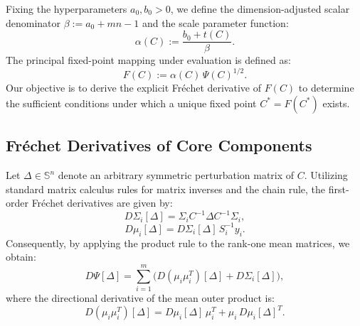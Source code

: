 \documentclass[11pt]{article}
\begin{document}
Fixing the hyperparameters $a_0, b_0 > 0$, we define the dimension-adjusted scalar denominator $\beta := a_0 + mn - 1$ and the scale parameter function:
\begin{equation}
\alpha(C) := \frac{b_0 + t(C)}{\beta}.
\end{equation}
The principal fixed-point mapping under evaluation is defined as:
\begin{equation}\label{eq:F-def}
F(C) := \alpha(C)\,\Psi(C)^{1/2}.
\end{equation}
Our objective is to derive the explicit Fr\'echet derivative of $F(C)$ to determine the sufficient conditions under which a unique fixed point $C^* = F(C^*)$ exists.

\subsection{Fr\'echet Derivatives of Core Components}
Let $\Delta \in \mathbb{S}^n$ denote an arbitrary symmetric perturbation matrix of $C$. Utilizing standard matrix calculus rules for matrix inverses and the chain rule, the first-order Fr\'echet derivatives are given by:
\begin{equation}\label{eq:dSigma}
D\Sigma_i[\Delta] = \Sigma_i C^{-1} \Delta C^{-1} \Sigma_i,
\end{equation}
\begin{equation}
D\mu_i[\Delta] = D\Sigma_i[\Delta] \, S_i^{-1} y_i.
\end{equation}
Consequently, by applying the product rule to the rank-one mean matrices, we obtain:
\begin{equation}\label{eq:dPsi}
D\Psi[\Delta] = \sum_{i=1}^m \big( D(\mu_i\mu_i^T)[\Delta] + D\Sigma_i[\Delta] \big),
\end{equation}
where the directional derivative of the mean outer product is:
\begin{equation}
D(\mu_i\mu_i^T)[\Delta] = D\mu_i[\Delta]\,\mu_i^T + \mu_i\,D\mu_i[\Delta]^T.
\end{equation}
\end{document}

